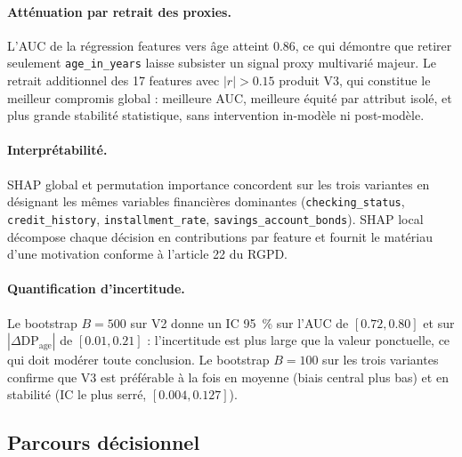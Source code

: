 \documentclass[11pt, a4paper]{article}
\begin{document}
\paragraph{Atténuation par retrait des proxies.} L'AUC de la régression features vers âge atteint 0.86, ce qui démontre que retirer seulement \texttt{age\_in\_years} laisse subsister un signal proxy multivarié majeur. Le retrait additionnel des 17 features avec $|r| > 0.15$ produit V3, qui constitue le meilleur compromis global : meilleure AUC, meilleure équité par attribut isolé, et plus grande stabilité statistique, sans intervention in-modèle ni post-modèle.

\paragraph{Interprétabilité.} SHAP global et permutation importance concordent sur les trois variantes en désignant les mêmes variables financières dominantes (\texttt{checking\_status}, \texttt{credit\_history}, \texttt{installment\_rate}, \texttt{savings\_account\_bonds}). SHAP local décompose chaque décision en contributions par feature et fournit le matériau d'une motivation conforme à l'article 22 du RGPD.

\paragraph{Quantification d'incertitude.} Le bootstrap $B = 500$ sur V2 donne un IC 95~\% sur l'AUC de $[0.72, 0.80]$ et sur $|\Delta\text{DP}_{\text{age}}|$ de $[0.01, 0.21]$ : l'incertitude est plus large que la valeur ponctuelle, ce qui doit modérer toute conclusion. Le bootstrap $B = 100$ sur les trois variantes confirme que V3 est préférable à la fois en moyenne (biais central plus bas) et en stabilité (IC le plus serré, $[0.004, 0.127]$).

\subsection{Parcours décisionnel}
\end{document}
